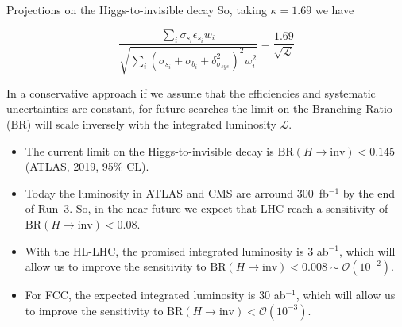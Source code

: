\documentclass{../../bredelebeamer}
\begin{document}
\begin{frame}{Projections on the Higgs-to-invisible decay}
    So, taking $\kappa=1.69$ we have

    \begin{equation}
         \frac{\sum_i \sigma_{s_i} \epsilon_{s_i} w_i}{\sqrt{\sum_i (\sigma_{s_i} + \sigma_{b_i} + \delta_{\sigma_{sys}}^2)^2 w_i^2}} = \frac{1.69}{\sqrt{\mathcal L}}
    \end{equation}

    In a conservative approach if we assume that the efficiencies and systematic uncertainties are constant, for future searches the limit on the Branching Ratio (BR) will scale inversely with the integrated luminosity $\mathcal{L}$. 
    \begin{itemize}
        \item The current limit on the Higgs-to-invisible decay is $\text{BR}(H \to \text{inv}) < 0.145$ (ATLAS, 2019, 95\% CL).
        \item Today the luminosity in ATLAS and CMS are arround 300~fb$^{-1}$ by the end of Run~3. So, in the near future we expect that LHC reach a sensitivity of $\text{BR}(H \to \text{inv}) < 0.08$.
        \item With the HL-LHC, the promised integrated luminosity is 3 ab$^{-1}$, which will allow us to improve the sensitivity to $\text{BR}(H \to \text{inv}) < 0.008 \sim \mathcal{O}(10^{-2})$.
        \item For FCC, the expected integrated luminosity is 30 ab$^{-1}$, which will allow us to improve the sensitivity to $\text{BR}(H \to \text{inv}) < \mathcal{O}(10^{-3})$.
    \end{itemize}
    
\end{frame}
\end{document}
